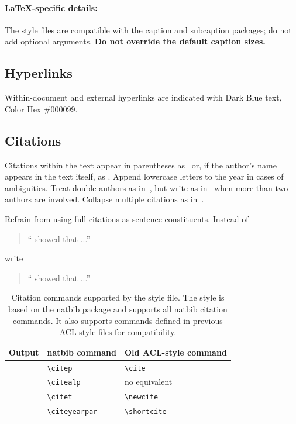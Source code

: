\documentclass[11pt,a4paper]{article}
\begin{document}
\paragraph{\LaTeX-specific details:}
The style files are compatible with the caption and subcaption packages; do not add optional arguments.
\textbf{Do not override the default caption sizes.}


\subsection{Hyperlinks}
Within-document and external hyperlinks are indicated with Dark Blue text, Color Hex \#000099.

\subsection{Citations}
Citations within the text appear in parentheses as~\citep{Gusfield:97} or, if the author's name appears in the text itself, as \citet{Gusfield:97}.
Append lowercase letters to the year in cases of ambiguities.  
Treat double authors as in~\citep{Aho:72}, but write as in~\citep{Chandra:81} when more than two authors are involved. Collapse multiple citations as in~\citep{Gusfield:97,Aho:72}. 

Refrain from using full citations as sentence constituents.
Instead of
\begin{quote}
  ``\citep{Gusfield:97} showed that ...''
\end{quote}
write
\begin{quote}
``\citet{Gusfield:97} showed that ...''
\end{quote}

\begin{table}
\centering
\begin{tabular}{lll}
\hline
\textbf{Output} & \textbf{natbib command} & \textbf{Old ACL-style command}\\
\hline
\citep{Gusfield:97} & \small\verb|\citep| & \small\verb|\cite| \\
\citealp{Gusfield:97} & \small\verb|\citealp| & no equivalent \\
\citet{Gusfield:97} & \small\verb|\citet| & \small\verb|\newcite| \\
\citeyearpar{Gusfield:97} & \small\verb|\citeyearpar| & \small\verb|\shortcite| \\
\hline
\end{tabular}
\caption{\label{citation-guide}
Citation commands supported by the style file.
The style is based on the natbib package and supports all natbib citation commands.
It also supports commands defined in previous ACL style files for compatibility.
}
\end{table}
\end{document}
